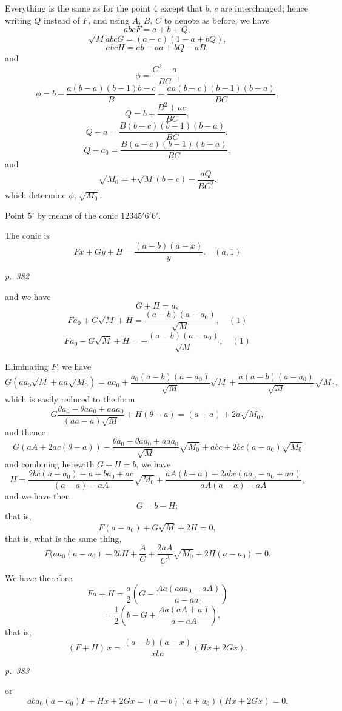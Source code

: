 \documentclass[11pt,a4paper]{article}
\theoremstyle{plain}
\theoremstyle{definition}
\begin{document}
Everything is the same as for the point 4 except that $b$, $c$ are interchanged;
hence writing $Q$ instead of $F$, and using $A$, $B$, $C$ to denote as before, we have
\[
abc F = a + b + Q,
\]
\[
\sqrt{M} abc G = (a - c)(1 - a + b Q),
\]
\[
abc H = a b - a a + b Q - a B,
\]
and
\[
\phi = \frac{C^2 - a}{B C}.
\]
\[
\phi = b - \frac{a(b - a)(b - 1) b - c}{B} - \frac{a a(b - c)(b - 1)(b - a)}{B C},
\]
\[
Q = b + \frac{B^2 + a c}{B C},
\]
\[
Q - a = \frac{B(b - c)(b - 1)(b - a)}{B C},
\]
\[
Q - a_0 = \frac{B(a - c)(b - 1)(b - a)}{B C},
\]
and
\[
\sqrt{M_0} = \pm \sqrt{M}(b - c) - \frac{a Q}{B C^2}.
\]
which determine $\phi$, $\sqrt{M_0}$.

Point 5' by means of the conic $12345'6'6'$.

The conic is
\[
Fx + Gy + H = \frac{(a - b)(a - x)}{y}. \quad (a, 1)
\]

\clearpage

\bigskip
\textit{p.~382}
\smallskip

\noindent
and we have
\[
G + H = a,
\]
\[
F a_0 + G \sqrt{M} + H = \frac{(a - b)(a - a_0)}{\sqrt{M}}, \quad (1)
\]
\[
F a_0 - G \sqrt{M} + H = -\frac{(a - b)(a - a_0)}{\sqrt{M}}, \quad (1)
\]

Eliminating $F$, we have
\[
G(a a_0 \sqrt{M} + a a \sqrt{M_0}) = a a_0 + \frac{a_0 (a - b)(a - a_0)}{\sqrt{M}}\sqrt{M} + \frac{a(a - b)(a - a_0)}{\sqrt{M}}\sqrt{M_0},
\]
which is easily reduced to the form
\[
G \frac{\theta a_0 - \theta a a_0 + a a a_0}{(a a - a)\sqrt{M}} + H(\theta - a) = (a + a) + 2a \sqrt{M_0},
\]
and thence
\[
G(a A + 2a c(\theta - a)) - \frac{\theta a_0 - \theta a a_0 + a a a_0}{\sqrt{M}} \sqrt{M_0} + abc + 2 b c (a - a_0) \sqrt{M_0}
\]
and combining herewith $G + H = b$, we have
\[
H = \frac{2 b c (a - a_0) - a + b a_0 + a c}{(a - a) - a A} \sqrt{M_0} + \frac{a A(b - a) + 2 a b c (a a_0 - a_0 + a a)}{a A (a - a) - a A},
\]
and we have then
\[
G = b - H;
\]
that is,
\[
F(a - a_0) + G \sqrt{M} + 2 H = 0,
\]
that is, what is the same thing,
\[
F(a a_0 (a - a_0) - 2 b H + \frac{A}{C} + \frac{2 a A}{C^2} \sqrt{M_0} + 2 H(a - a_0) = 0.
\]

We have therefore
\[
F a + H = \frac{a}{2}\left(G - \frac{Aa(a a a_0 - a A)}{a - a a_0}\right)
\]
\[
\quad = \frac{1}{2}\left(b - G + \frac{Aa(a A + a)}{a - a A}\right),
\]
that is,
\[
(F + H)\,x = \frac{(a - b)(a - x)}{x b a} (Hx + 2 G x).
\]

\clearpage

\bigskip
\textit{p.~383}
\smallskip

\noindent
or
\[
ab a_0 (a - a_0) F + H x + 2 G x = (a - b)(a + a_0)(Hx + 2 G x) = 0.
\]
\end{document}
